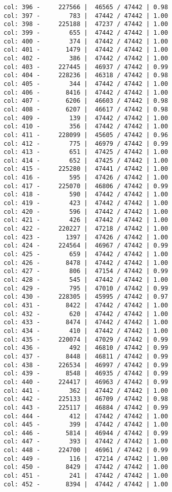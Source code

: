\documentclass[11pt]{article}
\begin{document}
\begin{Verbatim}[commandchars=\\\{\}]
col: 396 -     227566 |  46565 / 47442 | 0.98
col: 397 -        783 |  47442 / 47442 | 1.00
col: 398 -     225188 |  47237 / 47442 | 1.00
col: 399 -        655 |  47442 / 47442 | 1.00
col: 400 -        374 |  47442 / 47442 | 1.00
col: 401 -       1479 |  47442 / 47442 | 1.00
col: 402 -        386 |  47442 / 47442 | 1.00
col: 403 -     227445 |  46937 / 47442 | 0.99
col: 404 -     228236 |  46318 / 47442 | 0.98
col: 405 -        344 |  47442 / 47442 | 1.00
col: 406 -       8416 |  47442 / 47442 | 1.00
col: 407 -       6206 |  46603 / 47442 | 0.98
col: 408 -       6207 |  46617 / 47442 | 0.98
col: 409 -        139 |  47442 / 47442 | 1.00
col: 410 -        356 |  47442 / 47442 | 1.00
col: 411 -     228099 |  45605 / 47442 | 0.96
col: 412 -        775 |  46979 / 47442 | 0.99
col: 413 -        651 |  47425 / 47442 | 1.00
col: 414 -        652 |  47425 / 47442 | 1.00
col: 415 -     225280 |  47441 / 47442 | 1.00
col: 416 -        595 |  47426 / 47442 | 1.00
col: 417 -     225070 |  46806 / 47442 | 0.99
col: 418 -        590 |  47442 / 47442 | 1.00
col: 419 -        423 |  47442 / 47442 | 1.00
col: 420 -        596 |  47442 / 47442 | 1.00
col: 421 -        426 |  47442 / 47442 | 1.00
col: 422 -     220227 |  47218 / 47442 | 1.00
col: 423 -       1397 |  47426 / 47442 | 1.00
col: 424 -     224564 |  46967 / 47442 | 0.99
col: 425 -        659 |  47442 / 47442 | 1.00
col: 426 -       8478 |  47442 / 47442 | 1.00
col: 427 -        806 |  47154 / 47442 | 0.99
col: 428 -        545 |  47442 / 47442 | 1.00
col: 429 -        795 |  47010 / 47442 | 0.99
col: 430 -     228305 |  45995 / 47442 | 0.97
col: 431 -       8422 |  47442 / 47442 | 1.00
col: 432 -        620 |  47442 / 47442 | 1.00
col: 433 -       8474 |  47442 / 47442 | 1.00
col: 434 -        410 |  47442 / 47442 | 1.00
col: 435 -     220074 |  47029 / 47442 | 0.99
col: 436 -        492 |  46810 / 47442 | 0.99
col: 437 -       8448 |  46811 / 47442 | 0.99
col: 438 -     226534 |  46997 / 47442 | 0.99
col: 439 -       8548 |  46935 / 47442 | 0.99
col: 440 -     224417 |  46963 / 47442 | 0.99
col: 441 -        362 |  47442 / 47442 | 1.00
col: 442 -     225133 |  46709 / 47442 | 0.98
col: 443 -     225117 |  46884 / 47442 | 0.99
col: 444 -        412 |  47442 / 47442 | 1.00
col: 445 -        399 |  47442 / 47442 | 1.00
col: 446 -       5814 |  46944 / 47442 | 0.99
col: 447 -        393 |  47442 / 47442 | 1.00
col: 448 -     224700 |  46961 / 47442 | 0.99
col: 449 -        116 |  47214 / 47442 | 1.00
col: 450 -       8429 |  47442 / 47442 | 1.00
col: 451 -        241 |  47442 / 47442 | 1.00
col: 452 -       8394 |  47442 / 47442 | 1.00

\end{Verbatim}
\end{document}
